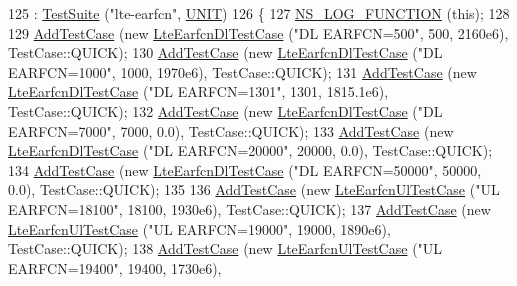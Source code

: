 \begin{DoxyCode}
125   : \hyperlink{classns3_1_1TestSuite_a904b0c40583b744d30908aeb94636d1a}{TestSuite} (\textcolor{stringliteral}{"lte-earfcn"}, \hyperlink{classns3_1_1TestSuite_a1ebfcab34ec8161e085e8e3a1855eae0a3885375a3787abf60431f8454b3cadbd}{UNIT})
126 \{
127   \hyperlink{log-macros-disabled_8h_a90b90d5bad1f39cb1b64923ea94c0761}{NS\_LOG\_FUNCTION} (\textcolor{keyword}{this});
128 
129   \hyperlink{classns3_1_1TestCase_a3718088e3eefd5d6454569d2e0ddd835}{AddTestCase} (\textcolor{keyword}{new} \hyperlink{classLteEarfcnDlTestCase}{LteEarfcnDlTestCase} (\textcolor{stringliteral}{"DL EARFCN=500"}, 500, 2160e6), 
      TestCase::QUICK);
130   \hyperlink{classns3_1_1TestCase_a3718088e3eefd5d6454569d2e0ddd835}{AddTestCase} (\textcolor{keyword}{new} \hyperlink{classLteEarfcnDlTestCase}{LteEarfcnDlTestCase} (\textcolor{stringliteral}{"DL EARFCN=1000"}, 1000, 1970e6), 
      TestCase::QUICK);
131   \hyperlink{classns3_1_1TestCase_a3718088e3eefd5d6454569d2e0ddd835}{AddTestCase} (\textcolor{keyword}{new} \hyperlink{classLteEarfcnDlTestCase}{LteEarfcnDlTestCase} (\textcolor{stringliteral}{"DL EARFCN=1301"}, 1301, 1815.1e6), 
      TestCase::QUICK);
132   \hyperlink{classns3_1_1TestCase_a3718088e3eefd5d6454569d2e0ddd835}{AddTestCase} (\textcolor{keyword}{new} \hyperlink{classLteEarfcnDlTestCase}{LteEarfcnDlTestCase} (\textcolor{stringliteral}{"DL EARFCN=7000"}, 7000, 0.0), 
      TestCase::QUICK);
133   \hyperlink{classns3_1_1TestCase_a3718088e3eefd5d6454569d2e0ddd835}{AddTestCase} (\textcolor{keyword}{new} \hyperlink{classLteEarfcnDlTestCase}{LteEarfcnDlTestCase} (\textcolor{stringliteral}{"DL EARFCN=20000"}, 20000, 0.0), 
      TestCase::QUICK);
134   \hyperlink{classns3_1_1TestCase_a3718088e3eefd5d6454569d2e0ddd835}{AddTestCase} (\textcolor{keyword}{new} \hyperlink{classLteEarfcnDlTestCase}{LteEarfcnDlTestCase} (\textcolor{stringliteral}{"DL EARFCN=50000"}, 50000, 0.0), 
      TestCase::QUICK);
135 
136   \hyperlink{classns3_1_1TestCase_a3718088e3eefd5d6454569d2e0ddd835}{AddTestCase} (\textcolor{keyword}{new} \hyperlink{classLteEarfcnUlTestCase}{LteEarfcnUlTestCase} (\textcolor{stringliteral}{"UL EARFCN=18100"}, 18100, 1930e6), 
      TestCase::QUICK);
137   \hyperlink{classns3_1_1TestCase_a3718088e3eefd5d6454569d2e0ddd835}{AddTestCase} (\textcolor{keyword}{new} \hyperlink{classLteEarfcnUlTestCase}{LteEarfcnUlTestCase} (\textcolor{stringliteral}{"UL EARFCN=19000"}, 19000, 1890e6), 
      TestCase::QUICK);
138   \hyperlink{classns3_1_1TestCase_a3718088e3eefd5d6454569d2e0ddd835}{AddTestCase} (\textcolor{keyword}{new} \hyperlink{classLteEarfcnUlTestCase}{LteEarfcnUlTestCase} (\textcolor{stringliteral}{"UL EARFCN=19400"}, 19400, 1730e6), 

\end{DoxyCode}
